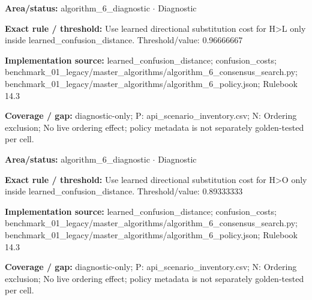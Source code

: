 \begin{tcolorbox}[enhanced,breakable,colback=white,colframe=Muted!45,boxrule=0.45pt,arc=1.5pt,left=6pt,right=6pt,top=5pt,bottom=5pt,title={\texttt{A6-LEARNED-SUBSTITUTION-H-L}},title after break={\texttt{A6-LEARNED-SUBSTITUTION-H-L}\ (continued)},fonttitle=\headingfont\bfseries\color{Navy},coltitle=Navy]
\textbf{Area/status:} algorithm\_\allowbreak{}6\_\allowbreak{}diagnostic $\boldsymbol{\cdot}$ Diagnostic\par
\smallskip
\textbf{Exact rule / threshold:} Use learned directional substitution cost for H>L only inside learned\_\allowbreak{}confusion\_\allowbreak{}distance. Threshold/\allowbreak{}value: 0.96666667\par
\smallskip
\textbf{Implementation source:} learned\_\allowbreak{}confusion\_\allowbreak{}distance; confusion\_\allowbreak{}costs; benchmark\_\allowbreak{}01\_\allowbreak{}legacy/\allowbreak{}master\_\allowbreak{}algorithms/\allowbreak{}algorithm\_\allowbreak{}6\_\allowbreak{}consensus\_\allowbreak{}search.py; benchmark\_\allowbreak{}01\_\allowbreak{}legacy/\allowbreak{}master\_\allowbreak{}algorithms/\allowbreak{}algorithm\_\allowbreak{}6\_\allowbreak{}policy.json; Rulebook 14.3\par
\smallskip
\textbf{Coverage / gap:} diagnostic-only; P: api\_\allowbreak{}scenario\_\allowbreak{}inventory.csv; N: Ordering exclusion; No live ordering effect; policy metadata is not separately golden-tested per cell.
\end{tcolorbox}
\begin{tcolorbox}[enhanced,breakable,colback=white,colframe=Muted!45,boxrule=0.45pt,arc=1.5pt,left=6pt,right=6pt,top=5pt,bottom=5pt,title={\texttt{A6-LEARNED-SUBSTITUTION-H-O}},title after break={\texttt{A6-LEARNED-SUBSTITUTION-H-O}\ (continued)},fonttitle=\headingfont\bfseries\color{Navy},coltitle=Navy]
\textbf{Area/status:} algorithm\_\allowbreak{}6\_\allowbreak{}diagnostic $\boldsymbol{\cdot}$ Diagnostic\par
\smallskip
\textbf{Exact rule / threshold:} Use learned directional substitution cost for H>O only inside learned\_\allowbreak{}confusion\_\allowbreak{}distance. Threshold/\allowbreak{}value: 0.89333333\par
\smallskip
\textbf{Implementation source:} learned\_\allowbreak{}confusion\_\allowbreak{}distance; confusion\_\allowbreak{}costs; benchmark\_\allowbreak{}01\_\allowbreak{}legacy/\allowbreak{}master\_\allowbreak{}algorithms/\allowbreak{}algorithm\_\allowbreak{}6\_\allowbreak{}consensus\_\allowbreak{}search.py; benchmark\_\allowbreak{}01\_\allowbreak{}legacy/\allowbreak{}master\_\allowbreak{}algorithms/\allowbreak{}algorithm\_\allowbreak{}6\_\allowbreak{}policy.json; Rulebook 14.3\par
\smallskip
\textbf{Coverage / gap:} diagnostic-only; P: api\_\allowbreak{}scenario\_\allowbreak{}inventory.csv; N: Ordering exclusion; No live ordering effect; policy metadata is not separately golden-tested per cell.
\end{tcolorbox}
